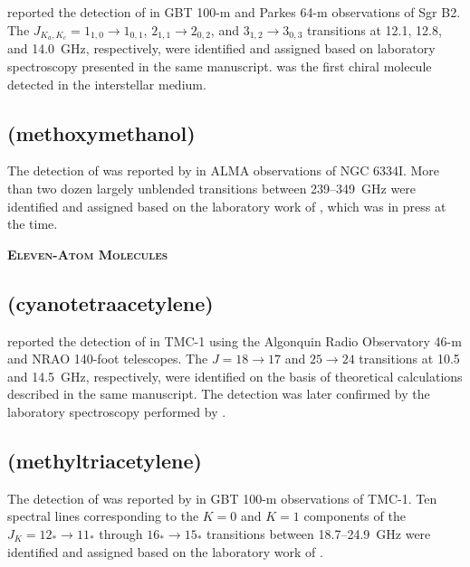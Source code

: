 \documentclass[twocolumn]{aastex631}
\begin{document}
	\citet{McGuire:2016ba} reported the detection of  in GBT 100-m and Parkes 64-m observations of Sgr B2.  The $J_{K_a,K_c} = 1_{1,0}\rightarrow1_{0,1}$, $2_{1,1}\rightarrow2_{0,2}$, and $3_{1,2}\rightarrow3_{0,3}$ transitions at 12.1, 12.8, and 14.0~GHz, respectively, were identified and assigned based on laboratory spectroscopy presented in the same manuscript.   was the first chiral molecule detected in the interstellar medium.
	
	\subsection{ (methoxymethanol)}
	\label{CH3OCH2OH}
	
	The detection of  was reported by \citet{McGuire:2017gy} in ALMA observations of NGC 6334I.  More than two dozen largely unblended transitions between 239--349~GHz were identified and assigned based on the laboratory work of \citet{Motiyenko:2017dw}, which was in press at the time.
	
    
    \begin{center}
        \large
        \textsc{\textbf{Eleven-Atom Molecules}}
        \label{11atoms}
        \normalsize
    \end{center}
    
    \subsection{ (cyanotetraacetylene)}
	\label{HC9N}
	
	\citet{Broten:1978iu} reported the detection of  in TMC-1 using the Algonquin Radio Observatory 46-m and NRAO 140-foot telescopes.  The $J = 18\rightarrow17$ and $25\rightarrow24$ transitions at 10.5 and 14.5~GHz, respectively, were identified on the basis of theoretical calculations described in the same manuscript.  The detection was later confirmed by the laboratory spectroscopy performed by \citet{Iida:1991rt}.
	
	\subsection{ (methyltriacetylene)}
	\label{CH3C6H}
	
	The detection of  was reported by \citet{Remijan:2006yd} in GBT 100-m observations of TMC-1.  Ten spectral lines corresponding to the $K=0$ and $K=1$ components of the $J_K = 12_*\rightarrow11_*$ through $16_*\rightarrow15_*$ transitions between 18.7--24.9~GHz were identified and assigned based on the laboratory work of \citet{Alexander:1978bd}.
	
\end{document}
